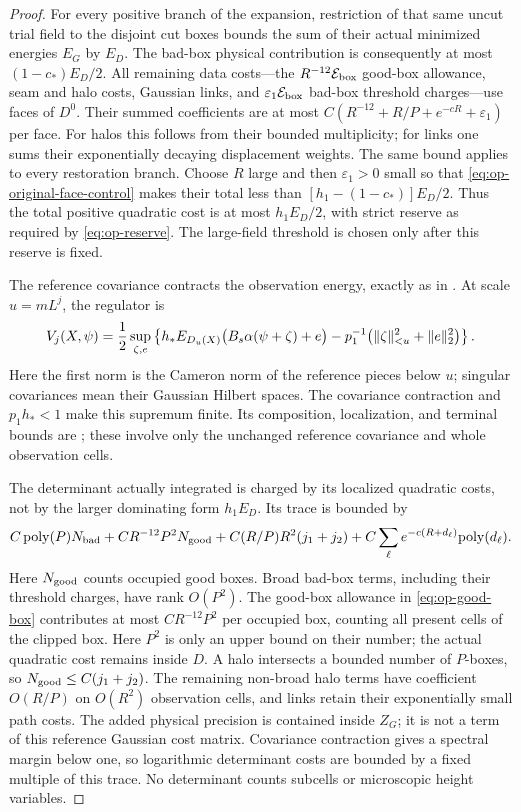 \begin{proof}
For every positive branch of the expansion, restriction of
that same uncut trial field to the disjoint cut boxes bounds
the sum of their actual minimized energies \(E_G\) by
\(E_D\).  The bad-box physical contribution is consequently
at most \((1-c_*)E_D/2\).  All remaining data costs---the
\(R^{-12}{\cal E}_{\rm box}\) good-box allowance, seam
and halo costs, Gaussian links, and
\(\varepsilon_1{\cal E}_{\rm box}\) bad-box threshold
charges---use faces of \(D^0\).  Their summed coefficients
are at most
\(C(R^{-12}+R/P+e^{-cR}+\varepsilon_1)\) per face.
For halos this follows from their bounded multiplicity;
for links one sums their exponentially decaying displacement
weights.  The same bound applies to every restoration branch.
Choose \(R\) large and then \(\varepsilon_1>0\) small so
that \eqref{eq:op-original-face-control} makes their total
less than \([h_1-(1-c_*)]E_D/2\).  Thus the total positive
quadratic cost is at most \(h_1E_D/2\), with strict reserve
as required by \eqref{eq:op-reserve}.  The large-field
threshold is chosen only after this reserve is fixed.

The reference covariance contracts the observation
energy, exactly as in .
At scale \(u=mL^j\), the regulator is
\begin{equation}\label{eq:op-regulator}
 V_j(X,\psi)=\frac12\sup_{\zeta,e}
 \left\{h_*E_{D_u(X)}\bigl(B_s\alpha(\psi+\zeta)+e\bigr)
       -p_1^{-1}\bigl(\lVert \zeta\rVert_{<u}^2+\lVert e\rVert_2^2\bigr)\right\}.
\end{equation}
Here the first norm is the Cameron norm of the reference
pieces below \(u\); singular covariances mean their
Gaussian Hilbert spaces.  The covariance contraction
and \(p_1h_*<1\) make this supremum finite.  Its
composition, localization, and terminal bounds are
; these involve only the unchanged
reference covariance and whole observation cells.

The determinant actually integrated is charged by its
localized quadratic costs, not by the larger dominating
form \(h_1E_D\).  Its trace is bounded by
\begin{equation}\label{eq:op-trace}
 C\,{\rm poly}(P)N_{\rm bad}
 +CR^{-12}P^2N_{\rm good}
 +C(R/P)R^2(j_1+j_2)
 +C\sum_\ell e^{-c(R+d_\ell)}{\rm poly}(d_\ell).
\end{equation}
Here \(N_{\rm good}\) counts occupied good boxes.
Broad bad-box terms, including their threshold charges,
have rank \(O(P^2)\).  The good-box allowance in
\eqref{eq:op-good-box} contributes at most
\(CR^{-12}P^2\) per occupied box, counting all present
cells of the clipped box.  Here \(P^2\) is only an upper
bound on their number; the actual quadratic cost remains
inside \(D\).  A halo intersects a bounded number of
\(P\)-boxes, so \(N_{\rm good}\leq C(j_1+j_2)\).
The remaining non-broad halo terms have coefficient
\(O(R/P)\) on \(O(R^2)\) observation cells, and links
retain their exponentially small path costs.
The added physical precision is contained inside \(Z_G\);
it is not a term of this reference Gaussian cost matrix.
Covariance contraction
gives a spectral margin below one, so logarithmic
determinant costs are bounded by a fixed multiple of
this trace.  No determinant counts subcells or
microscopic height variables.


\end{proof}
